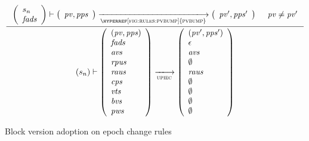 \begin{figure}[htb]
\begin{equation}
    \inference
    {
      {\left(\begin{array}{l}
         s_n\\
         \var{fads}
       \end{array}\right)}
      \vdash
      {
        \left(
          \begin{array}{l}
            \var{pv}, \var{pps}\\
          \end{array}
        \right)
      }
      \trans{\hyperref[fig:rules:pvbump]{pvbump}}{}
      {
        \left(
          \begin{array}{l}
            \var{pv'}, \var{pps'}\\
          \end{array}
        \right)
      }
      & \var{pv} \neq \var{pv'}
    }
    {
      (s_n)
      \vdash
      {
        \left(
          \begin{array}{l}
            \var{(\var{pv}, \var{pps})}\\
            \var{fads}\\
            \var{avs}\\
            \var{rpus}\\
            \var{raus}\\
            \var{cps}\\
            \var{vts}\\
            \var{bvs}\\
            \var{pws}
          \end{array}
        \right)
      }
      \trans{upiec}{}
      {
        \left(
          \begin{array}{l}
            (\var{pv'}, \var{pps'})\\
            \epsilon\\
            \var{avs}\\
            \emptyset\\
            \var{raus}\\
            \emptyset\\
            \emptyset\\
            \emptyset\\
            \emptyset\\
          \end{array}
        \right)
      }
    }
  \end{equation}
  \caption{Block version adoption on epoch change rules}
  \label{fig:rules:upi-ec}
\end{figure}

